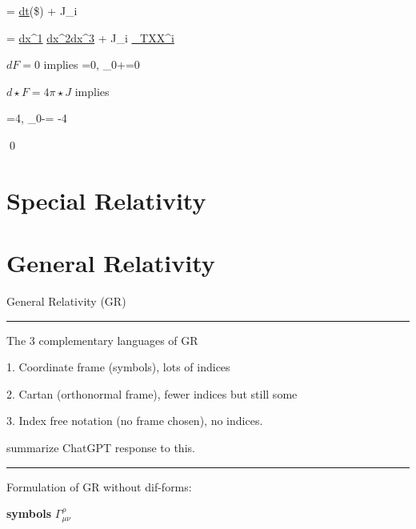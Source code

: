 \beq
{}
\eeq

\beq{}
= \rho \ul{dt}(\$) + J_i 
\eeq

\beq
{}=
\rho \ul{dx^1} \wedge \ul{dx^2}\wedge \ul{dx^3} + J_i \ul{\s_{TXX}^i}
\eeq

$dF=0$ implies
\beq
\nabla {}=0,
\quad
\partial_0+\nabla\times {}=0
\eeq

$d\star F=4\pi \star J$ implies

\beq
\nabla {}=4\pi \rho,
\quad
\partial_0-\nabla\times {}=
-4\pi {}
\eeq

\qed


\section{Special Relativity}



\section{General Relativity}\label{sec-gen-rel}

General Relativity (GR)

\hrule
The 3 complementary languages of GR

1. Coordinate frame (\Chris symbols), lots of indices

2. Cartan (orthonormal frame), fewer indices but still some

3. Index free notation (no frame chosen), no indices.

summarize ChatGPT response to this.


\hrule
Formulation of
GR
without dif-forms:

{\bf \Chris symbols}
$
\Gamma^\rho_{\mu\nu}$

